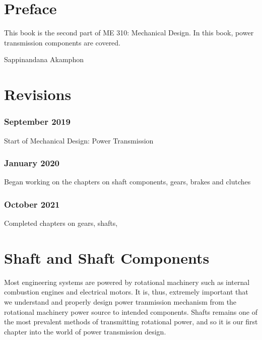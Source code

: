 \documentclass[a4paper,openany]{tufte-book}
\begin{document}
\restoregeometry
\nopagecolor

\frontmatter

\chapter{Preface}
\label{sec:orgb2ecd93}
This book is the second part of ME 310: Mechanical Design. In this book,
power transmission components are covered.

Sappinandana Akamphon

\tableofcontents

\listoffigures

\listoftables

\chapter{Revisions}
\label{sec:org994484c}
\subsection{September 2019}
\label{sec:orgb729eea}

Start of Mechanical Design: Power Transmission

\subsection{January 2020}
\label{sec:org0aaad6e}

Began working on the chapters on shaft components, gears, brakes and clutches

\subsection{October 2021}
\label{sec:orged8a650}

Completed chapters on gears, shafts,

\mainmatter

\chapter{Shaft and Shaft Components}
\label{sec:org9d8623a}

Most engineering systems are powered by rotational machinery such as
internal combustion engines and electrical motors. It is, thus,
extremely important that we understand and properly design power
tranmission mechanism from the rotational machinery power source to
intended components. Shafts remains one of the most prevalent methods of
transmitting rotational power, and so it is our first chapter into the
world of power transmission design.
\end{document}
